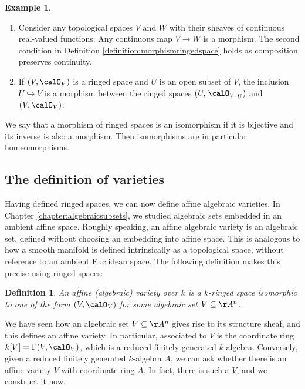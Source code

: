 \documentclass[12pt]{amsart}
\theoremstyle{plain}
\newtheorem{definition}[theorem]{Definition}
\theoremstyle{definition}
\newtheorem{example}[theorem]{Example}
\begin{document}
\begin{example}
\begin{enumerate}
\item
Consider any topological spaces $V$ and $W$ with their sheaves of continuous real-valued functions.
Any continuous map $V \to W$ is a morphism. The second condition in Definition \ref{definition:morphismringedspace} holds as composition preserves continuity.

\item
If $(V, \calO_V)$ is a ringed space and $U$ is an open subset of $V$, the inclusion $U \hookrightarrow V$ is a morphism between the ringed spaces $(U, \left. \calO_V\right|_U)$ and $(V, \calO_V)$.
\end{enumerate}
\end{example}

We say that a morphism of ringed spaces is an isomorphism if it is bijective and its inverse is also a morphism.
Then isomorphisms are in particular homeomorphisms.





\subsection{The definition of varieties}
Having defined ringed spaces, we can now define affine algebraic varieties.
In Chapter \ref{chapter:algebraicsubsets}, we studied algebraic sets embedded in an ambient affine space.
Roughly speaking, an affine algebraic variety is an algebraic set, defined without choosing an embedding into affine space.
This is analogous to how a smooth manifold is defined intrinsically as a topological space, without reference to an ambient Euclidean space.
The following definition makes this precise using ringed spaces:

\begin{definition}
An affine (algebraic) variety over $k$ is a $k$-ringed space isomorphic to one of the form $(V, \calO_V)$ for some algebraic set $V \subseteq \AA^n$.
\end{definition}


We have seen how an algebraic set $V \subseteq \AA^n$ gives rise to its structure sheaf, and this defines an affine variety.
In particular, associated to $V$ is the coordinate ring $k[V] = \Gamma(V, \calO_V)$, which is a reduced finitely generated $k$-algebra.
Conversely, given a reduced finitely generated $k$-algebra $A$, we can ask whether there is an affine variety $V$ with coordinate ring $A$.
In fact, there is such a $V$, and we construct it now.
\end{document}
